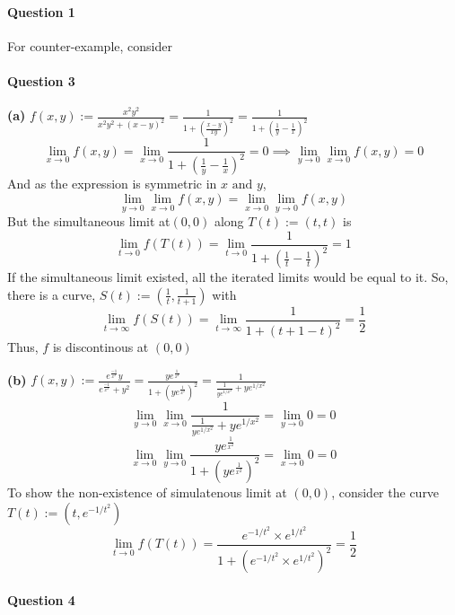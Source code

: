 \documentclass[20pt,a4paper]{extarticle} %
\theoremstyle{definition}
\theoremstyle{definition}
\begin{document}
\paragraph{Question 1}
For counter-example, consider
\newpage
\paragraph{Question 3}
\textbf{(a)} $f(x,y):=\frac{x^2y^2}{x^2y^2+(x-y)^2}=\frac{1}{1+(\frac{x-y}{xy})^2}=\frac{1}{1+(\frac{1}{y}-\frac{1}{x})^2}$\\
\[ \lim_{x \to 0} f(x,y)=\lim_{x \to 0} \frac{1}{1+(\frac{1}{y}-\frac{1}{x})^2}=0
\implies \lim_{y \to 0}\lim_{x \to 0}f(x,y)=0 \]
And as the expression is symmetric in $x \text{ and } y$,
\[ \lim_{y \to 0}\lim_{x \to 0}f(x,y)=\lim_{x \to 0}\lim_{y \to 0}f(x,y)\]
But the simultaneous limit at$(0,0)$  along $T(t):=(t,t) $ is
\[ \lim_{t \to 0} f(T(t))= \lim_{t \to 0} \frac{1}{1+(\frac{1}{t}-\frac{1}{t})^2}=1 \]
If the simultaneous limit existed, all the iterated limits would be equal to it. So, there is a curve,
$S(t):=(\frac{1}{t},\frac{1}{t+1})$ with
\[ \lim_{t \to \infty} f(S(t)) = \lim_{t \to \infty} \frac{1}{1+(t+1-t)^2}=\frac{1}{2} \]
Thus, $f$ is discontinous at $(0,0)$

\textbf{(b)} $f(x,y):=\frac{e^{\frac{-1}{x^2}}y}{e^{\frac{-1}{x^2}}+y^2}=\frac{ye^{\frac{1}{x^2}}}
{ 1+(ye^{\frac{1}{x^2}})^2}=\frac{1}{ \frac{1}{ye^{1/x^2}}+ye^{1/x^2}} $\\
\[ \lim_{y \to 0} \lim_{x \to 0}\frac{1}{ \frac{1}{ye^{1/x^2}}+ye^{1/x^2}}= \lim_{y \to 0} 0=0  \]
\[ \lim_{x \to 0} \lim_{y \to 0}\frac{ye^{\frac{1}{x^2}}}{ 1+(ye^{\frac{1}{x^2}})^2}=\lim_{x \to 0} 0=0\]
To show the non-existence of simulatenous limit at $(0,0)$, consider the curve $T(t):=(t,e^{-1/t^2})$
\[ \lim_{t \to 0} f(T(t)) = \frac{e^{-1/t^2}\times e^{1/t^2}}{1+(e^{-1/t^2}\times e^{1/t^2})^2}=\frac{1}{2} \]

\paragraph{Question 4}
\end{document}
